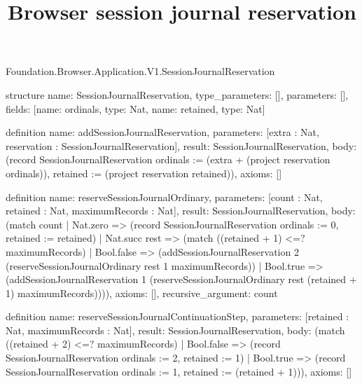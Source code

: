 \begin{lexlean}{Foundation.Browser.Application.V1.SessionJournalReservation}
\title{Browser session journal reservation}
\begin{semanticmodule}
structure{
  name: SessionJournalReservation,
  type_parameters: [],
  parameters: [],
  fields: [{name: ordinals, type: Nat}, {name: retained, type: Nat}]
}

definition{
  name: addSessionJournalReservation,
  parameters: [extra : Nat, reservation : SessionJournalReservation],
  result: SessionJournalReservation,
  body: (record SessionJournalReservation {ordinals := (extra + (project reservation ordinals)), retained := (project reservation retained)}),
  axioms: []
}

definition{
  name: reserveSessionJournalOrdinary,
  parameters: [count : Nat, retained : Nat, maximumRecords : Nat],
  result: SessionJournalReservation,
  body: (match count
    | Nat.zero => (record SessionJournalReservation {ordinals := 0, retained := retained})
    | Nat.succ rest => (match ((retained + 1) <=? maximumRecords)
      | Bool.false => (addSessionJournalReservation 2 (reserveSessionJournalOrdinary rest 1 maximumRecords))
      | Bool.true => (addSessionJournalReservation 1 (reserveSessionJournalOrdinary rest (retained + 1) maximumRecords)))),
  axioms: [],
  recursive_argument: count
}

definition{
  name: reserveSessionJournalContinuationStep,
  parameters: [retained : Nat, maximumRecords : Nat],
  result: SessionJournalReservation,
  body: (match ((retained + 2) <=? maximumRecords)
    | Bool.false => (record SessionJournalReservation {ordinals := 2, retained := 1})
    | Bool.true => (record SessionJournalReservation {ordinals := 1, retained := (retained + 1)})),
  axioms: []
}


\end{semanticmodule}
\end{lexlean}
